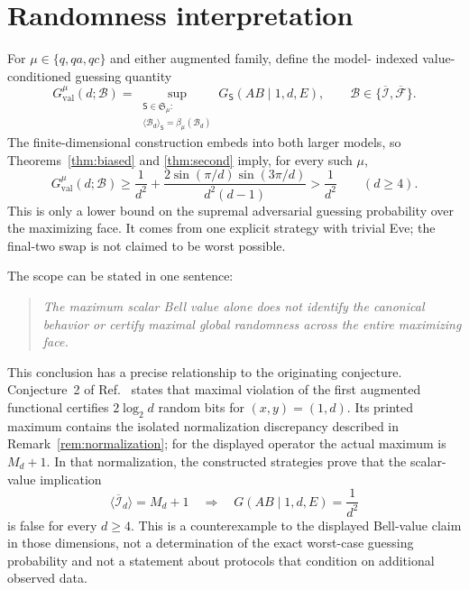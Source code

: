 \documentclass[11pt]{article}
\theoremstyle{definition}
\theoremstyle{remark}
\newcommand{\cI}{\mathcal I}
\newcommand{\cF}{\mathcal F}
\begin{document}
\section{Randomness interpretation}
\label{sec:randomness}

For \(\mu\in\{q,qa,qc\}\) and either augmented family, define the model-
indexed value-conditioned guessing quantity
\begin{equation}
 G_{\mathrm{val}}^\mu(d;\mathcal B)
 =\sup_{\substack{\mathsf S\in\mathfrak S_\mu:\\
 \langle\mathcal B_d\rangle_{\mathsf S}=\beta_\mu(\mathcal B_d)}}
 G_{\mathsf S}(AB\mid1,d,E),
 \qquad
 \mathcal B\in\{\overline{\cI},\overline{\cF}\}.
 \label{eq:gval-model}
\end{equation}
The finite-dimensional construction embeds into both larger models, so
Theorems~\ref{thm:biased} and \ref{thm:second} imply, for every such \(\mu\),
\begin{equation}
 G_{\mathrm{val}}^\mu(d;\mathcal B)
 \geq\frac1{d^2}
 +\frac{2\sin(\pi/d)\sin(3\pi/d)}{d^2(d-1)}
 >\frac1{d^2}
 \qquad(d\geq4).
 \label{eq:value-conditioned}
\end{equation}
This is only a lower bound on the supremal adversarial guessing probability
over the maximizing face.  It comes from one explicit strategy with trivial
Eve; the final-two swap is not claimed to be worst possible.

The scope can be stated in one sentence:
\begin{quote}
\emph{The maximum scalar Bell value alone does not identify the canonical
behavior or certify maximal global randomness across the entire maximizing
face.}
\end{quote}

This conclusion has a precise relationship to the originating conjecture.
Conjecture~2 of Ref.~\cite{PeritoEtAl2026} states that maximal violation of
the first augmented functional certifies \(2\log_2d\) random bits for
\((x,y)=(1,d)\).  Its printed maximum contains the isolated normalization
discrepancy described in Remark~\ref{rem:normalization}; for the displayed
operator the actual maximum is \(M_d+1\).  In that normalization, the
constructed strategies prove that the scalar-value implication
\[
 \langle\overline{\cI}_d\rangle=M_d+1
 \quad\Longrightarrow\quad
 G(AB\mid1,d,E)=\frac1{d^2}
\]
is false for every \(d\geq4\).  This is a counterexample to the displayed
Bell-value claim in those dimensions, not a determination of the exact
worst-case guessing probability and not a statement about protocols that
condition on additional observed data.
\end{document}
